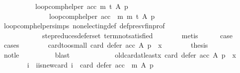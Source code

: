 \begin{isabellebody}
\ \ \ \ \ \ \ \ \ \ loop{\isacharunderscore}{\kern0pt}comp{\isacharunderscore}{\kern0pt}helper\ acc\ m\ t\ A\ p\ {\isacharequal}{\kern0pt}\isanewline
\ \ \ \ \ \ \ \ \ \ \ \ \ \ loop{\isacharunderscore}{\kern0pt}comp{\isacharunderscore}{\kern0pt}helper\ {\isacharparenleft}{\kern0pt}acc\ {\isasymtriangleright}\ m{\isacharparenright}{\kern0pt}\ m\ t\ A\ p{\isachardoublequoteclose}\ \isanewline
\ \ \ \ \ \ \isamarkupfalse%
\ loop{\isacharunderscore}{\kern0pt}comp{\isacharunderscore}{\kern0pt}helper{\isachardot}{\kern0pt}simps{\isacharparenleft}{\kern0pt}{}{\isacharparenright}{\kern0pt}\ non{\isacharunderscore}{\kern0pt}electing{\isacharunderscore}{\kern0pt}def\ def{\isacharunderscore}{\kern0pt}presv{\isacharunderscore}{\kern0pt}fin{\isacharunderscore}{\kern0pt}prof\isanewline
\ \ \ \ \ \ \ \ \ \ \ \ step{\isacharunderscore}{\kern0pt}reduces{\isacharunderscore}{\kern0pt}defer{\isacharunderscore}{\kern0pt}set\ term{\isacharunderscore}{\kern0pt}not{\isacharunderscore}{\kern0pt}satisfied\isanewline
\ \ \ \ \ \ \isamarkupfalse%
\ metis\isanewline
\ \ \ \ \isamarkupfalse%
\ {\isacharquery}{\kern0pt}case\isanewline
\ \ \ \ \isamarkupfalse%
\ cases\isanewline
\ \ \ \ \ \ \isamarkupfalse%
\ card{\isacharunderscore}{\kern0pt}too{\isacharunderscore}{\kern0pt}small{\isacharcolon}{\kern0pt}\ {\isachardoublequoteopen}card\ {\isacharparenleft}{\kern0pt}defer\ acc\ A\ p{\isacharparenright}{\kern0pt}\ {\isacharless}{\kern0pt}\ x{\isachardoublequoteclose}\isanewline
\ \ \ \ \ \ \isamarkupfalse%
\ {\isacharquery}{\kern0pt}thesis\isanewline
\ \ \ \ \ \ \ \ \isamarkupfalse%
\ not{\isacharunderscore}{\kern0pt}le\isanewline
\ \ \ \ \ \ \ \ \isamarkupfalse%
\ blast\isanewline
\ \ \ \ \isamarkupfalse%
\isanewline
\ \ \ \ \ \ \isamarkupfalse%
\ old{\isacharunderscore}{\kern0pt}card{\isacharunderscore}{\kern0pt}at{\isacharunderscore}{\kern0pt}least{\isacharunderscore}{\kern0pt}x{\isacharcolon}{\kern0pt}\ {\isachardoublequoteopen}{\isasymnot}{\isacharparenleft}{\kern0pt}card\ {\isacharparenleft}{\kern0pt}defer\ acc\ A\ p{\isacharparenright}{\kern0pt}\ {\isacharless}{\kern0pt}\ x{\isacharparenright}{\kern0pt}{\isachardoublequoteclose}\isanewline
\ \ \ \ \ \ \isamarkupfalse%
\ i\ \ i{\isacharunderscore}{\kern0pt}is{\isacharunderscore}{\kern0pt}new{\isacharunderscore}{\kern0pt}card{\isacharcolon}{\kern0pt}\ {\isachardoublequoteopen}i\ {\isacharequal}{\kern0pt}\ card\ {\isacharparenleft}{\kern0pt}defer\ {\isacharparenleft}{\kern0pt}acc\ {\isasymtriangleright}\ m{\isacharparenright}{\kern0pt}\ A\ p{\isacharparenright}{\kern0pt}{\isachardoublequoteclose}\isanewline

\end{isabellebody}

